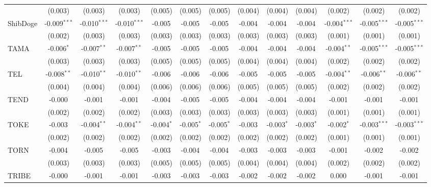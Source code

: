 \begin{table}[!htbp]
\begin{tabular}{@{\extracolsep{5pt}}lcccccccccccc}
  & (0.003) & (0.003) & (0.003) & (0.005) & (0.005) & (0.005) & (0.004) & (0.004) & (0.004) & (0.002) & (0.002) & (0.002) \\
 ShibDoge & -0.009$^{***}$ & -0.010$^{***}$ & -0.010$^{***}$ & -0.005$^{}$ & -0.005$^{}$ & -0.005$^{}$ & -0.004$^{}$ & -0.004$^{}$ & -0.004$^{}$ & -0.004$^{***}$ & -0.005$^{***}$ & -0.005$^{***}$ \\
  & (0.002) & (0.003) & (0.003) & (0.003) & (0.003) & (0.003) & (0.003) & (0.003) & (0.003) & (0.001) & (0.001) & (0.001) \\
 TAMA & -0.006$^{*}$ & -0.007$^{**}$ & -0.007$^{**}$ & -0.005$^{}$ & -0.005$^{}$ & -0.005$^{}$ & -0.004$^{}$ & -0.004$^{}$ & -0.004$^{}$ & -0.004$^{**}$ & -0.005$^{***}$ & -0.005$^{***}$ \\
  & (0.003) & (0.003) & (0.003) & (0.005) & (0.005) & (0.005) & (0.004) & (0.004) & (0.004) & (0.002) & (0.002) & (0.002) \\
 TEL & -0.008$^{**}$ & -0.010$^{**}$ & -0.010$^{**}$ & -0.006$^{}$ & -0.006$^{}$ & -0.006$^{}$ & -0.005$^{}$ & -0.005$^{}$ & -0.005$^{}$ & -0.004$^{**}$ & -0.006$^{**}$ & -0.006$^{**}$ \\
  & (0.004) & (0.004) & (0.004) & (0.006) & (0.006) & (0.006) & (0.005) & (0.005) & (0.005) & (0.002) & (0.002) & (0.002) \\
 TEND & -0.000$^{}$ & -0.001$^{}$ & -0.001$^{}$ & -0.004$^{}$ & -0.005$^{}$ & -0.005$^{}$ & -0.004$^{}$ & -0.004$^{}$ & -0.004$^{}$ & -0.001$^{}$ & -0.001$^{}$ & -0.001$^{}$ \\
  & (0.002) & (0.002) & (0.002) & (0.003) & (0.003) & (0.003) & (0.003) & (0.003) & (0.003) & (0.001) & (0.001) & (0.001) \\
 TOKE & -0.003$^{}$ & -0.004$^{**}$ & -0.004$^{**}$ & -0.004$^{*}$ & -0.005$^{*}$ & -0.005$^{*}$ & -0.003$^{}$ & -0.003$^{*}$ & -0.003$^{*}$ & -0.002$^{*}$ & -0.003$^{***}$ & -0.003$^{***}$ \\
  & (0.002) & (0.002) & (0.002) & (0.002) & (0.002) & (0.002) & (0.002) & (0.002) & (0.002) & (0.001) & (0.001) & (0.001) \\
 TORN & -0.004$^{}$ & -0.005$^{}$ & -0.005$^{}$ & -0.003$^{}$ & -0.004$^{}$ & -0.004$^{}$ & -0.003$^{}$ & -0.003$^{}$ & -0.003$^{}$ & -0.001$^{}$ & -0.002$^{}$ & -0.002$^{}$ \\
  & (0.003) & (0.003) & (0.003) & (0.005) & (0.005) & (0.005) & (0.004) & (0.004) & (0.004) & (0.002) & (0.002) & (0.002) \\
 TRIBE & -0.000$^{}$ & -0.001$^{}$ & -0.001$^{}$ & -0.003$^{}$ & -0.003$^{}$ & -0.003$^{}$ & -0.002$^{}$ & -0.002$^{}$ & -0.002$^{}$ & 0.000$^{}$ & -0.001$^{}$ & -0.001$^{}$ \\

\end{tabular}
\end{table}
